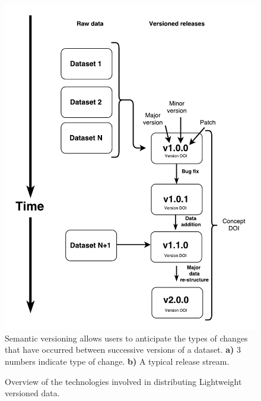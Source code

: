 \documentclass[a4paper,11pt]{article}
\begin{document}
\begin{figure}[!hb]
\centering
\includegraphics[width=\linewidth]{figures/Figure1.pdf}
\caption{Semantic versioning allows users to anticipate the types of changes that have occurred between successive versions of a dataset.
\textbf{a)} 3 numbers indicate type of change.
\textbf{b)} A typical release stream.}
\label{fig:semantic}
\end{figure}

\newpage


\begin{figure}[!hb]
\centering
\caption{Overview of the technologies involved in distributing Lightweight versioned data.}
\label{fig:technology_stack}
\end{figure}

\end{document}
